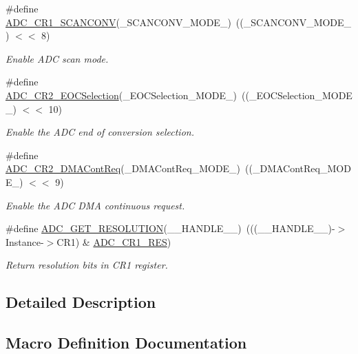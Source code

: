 \begin{DoxyCompactItemize}
\#define \hyperlink{group___a_d_c___private___macros_gad46aba92287da828c570fab3599e38c2}{A\+D\+C\+\_\+\+C\+R1\+\_\+\+S\+C\+A\+N\+C\+O\+NV}(\+\_\+\+S\+C\+A\+N\+C\+O\+N\+V\+\_\+\+M\+O\+D\+E\+\_\+)~((\+\_\+\+S\+C\+A\+N\+C\+O\+N\+V\+\_\+\+M\+O\+D\+E\+\_\+) $<$$<$ 8)
\begin{DoxyCompactList}\small\item\em Enable A\+DC scan mode. \end{DoxyCompactList}\item 
\#define \hyperlink{group___a_d_c___private___macros_gaa6514c197b4d16b3d08938cdad573ef5}{A\+D\+C\+\_\+\+C\+R2\+\_\+\+E\+O\+C\+Selection}(\+\_\+\+E\+O\+C\+Selection\+\_\+\+M\+O\+D\+E\+\_\+)~((\+\_\+\+E\+O\+C\+Selection\+\_\+\+M\+O\+D\+E\+\_\+) $<$$<$ 10)
\begin{DoxyCompactList}\small\item\em Enable the A\+DC end of conversion selection. \end{DoxyCompactList}\item 
\#define \hyperlink{group___a_d_c___private___macros_ga93bf2d0e4b9f98b83ee48be918e9c940}{A\+D\+C\+\_\+\+C\+R2\+\_\+\+D\+M\+A\+Cont\+Req}(\+\_\+\+D\+M\+A\+Cont\+Req\+\_\+\+M\+O\+D\+E\+\_\+)~((\+\_\+\+D\+M\+A\+Cont\+Req\+\_\+\+M\+O\+D\+E\+\_\+) $<$$<$ 9)
\begin{DoxyCompactList}\small\item\em Enable the A\+DC D\+MA continuous request. \end{DoxyCompactList}\item 
\#define \hyperlink{group___a_d_c___private___macros_gae2da95074db4dd0418c1dd1f13ad7970}{A\+D\+C\+\_\+\+G\+E\+T\+\_\+\+R\+E\+S\+O\+L\+U\+T\+I\+ON}(\+\_\+\+\_\+\+H\+A\+N\+D\+L\+E\+\_\+\+\_\+)~(((\+\_\+\+\_\+\+H\+A\+N\+D\+L\+E\+\_\+\+\_\+)-\/$>$Instance-\/$>$C\+R1) \& \hyperlink{group___peripheral___registers___bits___definition_ga71e4a4c233895a2e7b6dd3ca6ca849e5}{A\+D\+C\+\_\+\+C\+R1\+\_\+\+R\+ES})
\begin{DoxyCompactList}\small\item\em Return resolution bits in C\+R1 register. \end{DoxyCompactList}\end{DoxyCompactItemize}


\subsection{Detailed Description}


\subsection{Macro Definition Documentation}
